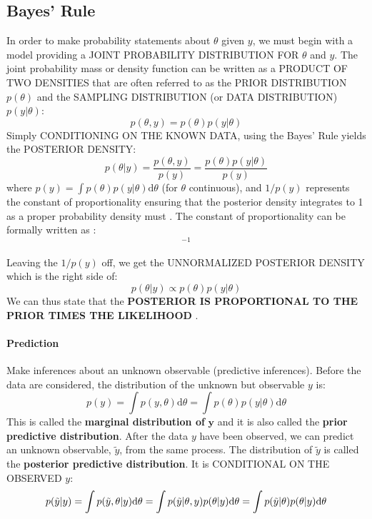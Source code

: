 \documentclass {article}
\begin{document}
\subsection {Bayes' Rule}
In order to make probability statements about $\theta$ given $y$, we must begin with a model providing a JOINT PROBABILITY DISTRIBUTION FOR $\theta$ and $y$. 
The joint probability mass or density function can be written as a PRODUCT OF TWO DENSITIES that are often referred to as the PRIOR DISTRIBUTION $p(\theta)$ and the SAMPLING DISTRIBUTION (or DATA DISTRIBUTION) $p(y| \theta)$: 
\begin{equation*}
p(\theta, y) = p(\theta)p(y | \theta)
\end{equation*}
Simply CONDITIONING ON THE KNOWN DATA, using the Bayes' Rule yields the POSTERIOR DENSITY:
\begin {equation*}
p(\theta | y) = \frac{p(\theta, y)}{p(y)}= \frac{p(\theta)p(y | \theta)}{p(y)}
\end{equation*}  
where $p(y)= \int p(\theta) p(y| \theta) \mathrm{d} \theta$ (for $\theta$ continuous), and $1/p(y)$ represents the constant of proportionality ensuring that the posterior density integrates to 1  as a proper probability density must \cite{jackman_bayesian_2009}. The constant of proportionality can be formally written as \cite{jackman_bayesian_2009}: 
\begin {equation*}
[\int p(y|\theta) p(\theta) \mathrm{d} \theta]^{-1}
\end {equation*}

Leaving the $1/p(y)$ off, we get the UNNORMALIZED POSTERIOR DENSITY which is the right side of:
\begin{equation*}
p(\theta | y) \propto p(\theta)p(y|\theta)
\end{equation*}
We can thus state that the \textbf{POSTERIOR IS PROPORTIONAL TO THE PRIOR TIMES THE LIKELIHOOD} \cite{jackman_bayesian_2009}.

\paragraph {Prediction}
Make inferences about an unknown observable (predictive inferences).
Before the data are considered, the distribution of the unknown but observable $y$ is:
\begin{equation*}
p(y) = \int p(y, \theta) \mathrm{d} \theta = \int p(\theta) p(y| \theta) \mathrm{d} \theta
\end{equation*}
This is called the \textbf{marginal distribution of} $\mathbf{y}$ and it is also called the \textbf{prior predictive distribution}.
After the data $y$ have been observed, we can predict an unknown observable, $\tilde{y}$, from the same process.
The distribution of $\tilde{y}$ is called the \textbf{posterior predictive distribution}. It is CONDITIONAL ON THE OBSERVED $y$:
\begin{equation*}
p(\tilde{y} | y) = \int p(\tilde{y}, \theta | y) \mathrm{d} \theta\\
 = \int p(\tilde{y} | \theta, y) p(\theta | y) \mathrm{d} \theta \\
 = \int p(\tilde{y} | \theta) p(\theta | y) \mathrm{d} \theta
\end{equation*}
\end{document}
